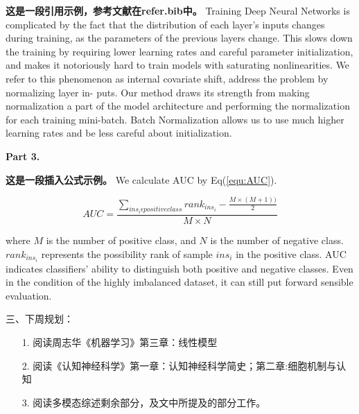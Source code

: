 \documentclass[UTF8,10.5pt]{article} %
\begin{document}
\textbf{这是一段引用示例，参考文献在refer.bib中。}
Training Deep Neural Networks is complicated by the fact \cite{diesase2012improving,levey2020nomenclature,hobson2015cost} that the distribution of each layer’s inputs changes during training, as the parameters of the previous layers change. This\cite{levey2020nomenclature} slows down the training by requiring lower learning rates and careful parameter initialization, and makes it notoriously hard to train models with saturating nonlinearities. We refer to this\cite{hobson2015cost} phenomenon as internal covariate shift, address the problem by normalizing layer in- puts. Our method draws its strength from making normalization a part of the model architecture and performing the normalization for each training mini-batch. Batch Normalization allows us to use much higher learning rates and be less careful about initialization. 

\vspace{0.5cm}
\noindent \textbf{Part 3.} 

\textbf{这是一段插入公式示例。}
We calculate AUC by Eq(\ref{equ:AUC}).

\begin{equation}
 \label{equ:AUC}
 AUC=\frac{\sum_{{ins_{i}\epsilon positiveclass}}rank_{ins_{i}}-\frac{M \times(M+1))}{2}}{M \times N}
\end{equation}

where $M$ is the number of positive class, and $N$ is the number of negative class. $rank_{ins_{i}}$ represents the possibility rank of sample $ins_{i}$ in the positive class. AUC indicates classifiers' ability to distinguish both positive and negative classes. Even in the condition of the highly imbalanced dataset, it can still put forward sensible evaluation.


\vspace{0.5cm}
\noindent 三、下周规划：
\begin{enumerate}[labelsep = .5em, leftmargin = -18pt, itemindent = 3em]
    \item [1.] 阅读周志华《机器学习》第三章：线性模型      
    \item [2.] 阅读《认知神经科学》第一章：认知神经科学简史；第二章:细胞机制与认知
    \item [3.] 阅读多模态综述剩余部分，及文中所提及的部分工作。
\end{enumerate}


\newpage



\end{document}
